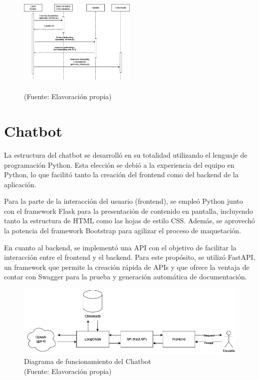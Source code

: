 \begin{figure}[ht!]
    \centering
    \includegraphics[width=0.5\textwidth]{figures/load_diagram.png}
    \caption[]{\\
    {\scriptsize (Fuente: Elavoración propia)}}
    \label{fig:chatbot1}
\end{figure}

\newpage
\section{Chatbot}

   
La estructura del chatbot se desarrolló en su totalidad utilizando el lenguaje de programación Python. Esta elección se debió a la 
experiencia del equipo en Python, lo que facilitó tanto la creación del frontend como del backend de la aplicación.

Para la parte de la interacción del usuario (frontend), se empleó Python junto con el framework Flask para la presentación 
de contenido en pantalla, incluyendo tanto la estructura de HTML como las hojas de estilo CSS. Además, se aprovechó la potencia del 
framework Bootstrap para agilizar el proceso de maquetación.

En cuanto al backend, se implementó una API con el objetivo de facilitar la interacción entre el frontend y el backend. Para este 
propósito, se utilizó FastAPI, un framework que permite la creación rápida de APIs y que ofrece la ventaja de contar con Swagger 
para la prueba y generación automática de documentación.

\begin{figure}[ht!]
    \centering
    \includegraphics[width=.8\textwidth]{figures/finalhuemul.png}
    \caption[Diagrama de funcionamiento del Chatbot]{Diagrama de funcionamiento del Chatbot\\
    {\scriptsize (Fuente: Elavoración propia)}}
    \label{fig:chatbot1}
\end{figure}

